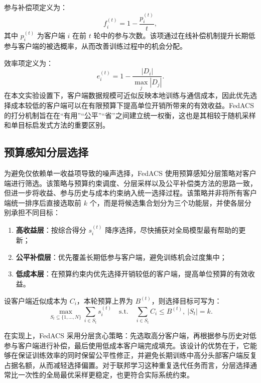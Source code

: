 \documentclass[UTF8,11pt]{ctexart}
\begin{document}
参与补偿项定义为：
\begin{equation}
 f_i^{(t)} = 1-\frac{p_i^{(t)}}{t},
\end{equation}
其中 $p_i^{(t)}$ 为客户端 $i$ 在前 $t$ 轮中的参与次数。该项通过在线补偿机制提升长期低参与客户端的被选概率，从而改善训练过程中的机会分配。

效率项定义为：
\begin{equation}
 e_i^{(t)} = 1-\frac{|D_i|}{\max_j |D_j|}.
\end{equation}
在本文实验设置下，客户端数据规模可近似反映本地训练与通信成本，因此优先选择成本较低的客户端可以在有限预算下提高单位开销所带来的有效收益。FedACS 的打分机制旨在在“有用”“公平”“省”之间建立统一权衡，这也是其相较于随机采样和单目标启发式方法的重要区别。

\subsection{预算感知分层选择}
为避免仅依赖单一收益项导致的噪声选择，FedACS 使用预算感知分层策略对客户端进行筛选。该策略与预算约束调度、分层采样以及公平补偿类方法的思路一致，但进一步将收益、参与历史与成本约束纳入统一选择过程\cite{perazzone2024communication,yan2024criticalfl,li2024adafl,wang2025resource}。该策略并非将所有客户端统一排序后直接选取前 $k$ 个，而是将候选集合划分为三个功能层，并使各层分别承担不同目标：
\begin{enumerate}
  \item \textbf{高收益层}：按综合得分 $s_i^{(t)}$ 降序选择，尽快捕获对全局模型最有帮助的更新；
  \item \textbf{公平补偿层}：优先覆盖长期低参与客户端，避免训练机会过度集中；
  \item \textbf{低成本层}：在预算约束内优先选择开销较低的客户端，提高单位预算的有效收益。
\end{enumerate}
设客户端近似成本为 $C_i$，本轮预算上界为 $B^{(t)}$，则选择目标可写为：
\begin{equation}
\max_{S_t\subseteq\{1,\dots,N\}}\sum_{i\in S_t}s_i^{(t)}\quad \text{s.t.}\quad \sum_{i\in S_t}C_i\le B^{(t)},\ |S_t|=k.
\end{equation}

在实现上，FedACS 采用分层贪心策略：先选取高分客户端，再根据参与历史对低参与客户端进行补偿，最后使用低成本客户端完成填充。该设计的优势在于，它能够在保证训练效率的同时保留公平性修正，并避免长期训练中高分头部客户端反复占据名额，从而减轻选择偏置。对于联邦学习这种重复迭代任务而言，分层选择通常比一次性的全局最优采样更稳定，也更符合实际系统约束。
\end{document}
